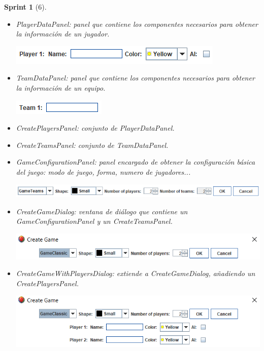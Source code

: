 \documentclass{article}
\theoremstyle{break}
\newtheorem*{sprint}{Sprint}
\begin{document}
\begin{sprint}[6]
\begin{itemize}
\item \textit{PlayerDataPanel}: panel que contiene los componentes necesarios para obtener la información de un jugador.
\begin{center}
\includegraphics[scale=1]{player-data-panel.png}
\end{center}
\item \textit{TeamDataPanel}: panel que contiene los componentes necesarios para obtener la información de un equipo.
\begin{center}
\includegraphics[scale=1]{team-data-panel.png}
\end{center}
\item \textit{CreatePlayersPanel}: conjunto de \textit{PlayerDataPanel}.
\item \textit{CreateTeamsPanel}: conjunto de \textit{TeamDataPanel}.
\item \textit{GameConfigurationPanel}: panel encargado de obtener la configuración básica del juego: modo de juego, forma, numero de jugadores...
\begin{center}
\includegraphics[scale=0.75]{game-config-panel.png}
\end{center}
\item \textit{CreateGameDialog}: ventana de diálogo que contiene un \textit{GameConfigurationPanel} y un \textit{CreateTeamsPanel}.
\begin{center}
\includegraphics[scale=0.8]{create-game-sprint6.png}
\end{center}
\item \textit{CreateGameWithPlayersDialog}: extiende a \textit{CreateGameDialog}, añadiendo un \textit{CreatePlayersPanel}.
\begin{center}
\includegraphics[scale=0.75]{create-game-players-sprint6.png}
\end{center}
\end{itemize}



\end{sprint}
\end{document}

